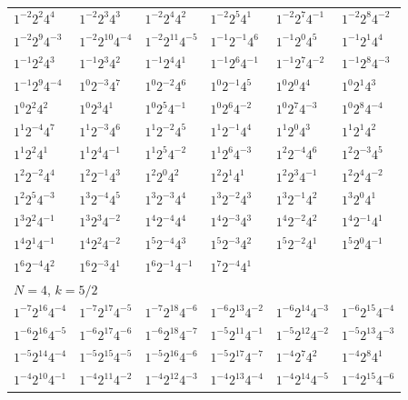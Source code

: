 \documentclass[12pt]{amsart}
\numberwithin{equation}{section}
\theoremstyle{plain}
\theoremstyle{definition}
\theoremstyle{remark}
\begin{document}
\begin{longtable}{llllll}
$1^{-2}2^{2}4^{4}$ & $1^{-2}2^{3}4^{3}$ & $1^{-2}2^{4}4^{2}$ & $1^{-2}2^{5}4^{1}$ & $1^{-2}2^{7}4^{-1}$ & $1^{-2}2^{8}4^{-2}$\\
$1^{-2}2^{9}4^{-3}$ & $1^{-2}2^{10}4^{-4}$ & $1^{-2}2^{11}4^{-5}$ & $1^{-1}2^{-1}4^{6}$ & $1^{-1}2^{0}4^{5}$ & $1^{-1}2^{1}4^{4}$\\
$1^{-1}2^{2}4^{3}$ & $1^{-1}2^{3}4^{2}$ & $1^{-1}2^{4}4^{1}$ & $1^{-1}2^{6}4^{-1}$ & $1^{-1}2^{7}4^{-2}$ & $1^{-1}2^{8}4^{-3}$\\
$1^{-1}2^{9}4^{-4}$ & $1^{0}2^{-3}4^{7}$ & $1^{0}2^{-2}4^{6}$ & $1^{0}2^{-1}4^{5}$ & $1^{0}2^{0}4^{4}$ & $1^{0}2^{1}4^{3}$\\
$1^{0}2^{2}4^{2}$ & $1^{0}2^{3}4^{1}$ & $1^{0}2^{5}4^{-1}$ & $1^{0}2^{6}4^{-2}$ & $1^{0}2^{7}4^{-3}$ & $1^{0}2^{8}4^{-4}$\\
$1^{1}2^{-4}4^{7}$ & $1^{1}2^{-3}4^{6}$ & $1^{1}2^{-2}4^{5}$ & $1^{1}2^{-1}4^{4}$ & $1^{1}2^{0}4^{3}$ & $1^{1}2^{1}4^{2}$\\
$1^{1}2^{2}4^{1}$ & $1^{1}2^{4}4^{-1}$ & $1^{1}2^{5}4^{-2}$ & $1^{1}2^{6}4^{-3}$ & $1^{2}2^{-4}4^{6}$ & $1^{2}2^{-3}4^{5}$\\
$1^{2}2^{-2}4^{4}$ & $1^{2}2^{-1}4^{3}$ & $1^{2}2^{0}4^{2}$ & $1^{2}2^{1}4^{1}$ & $1^{2}2^{3}4^{-1}$ & $1^{2}2^{4}4^{-2}$\\
$1^{2}2^{5}4^{-3}$ & $1^{3}2^{-4}4^{5}$ & $1^{3}2^{-3}4^{4}$ & $1^{3}2^{-2}4^{3}$ & $1^{3}2^{-1}4^{2}$ & $1^{3}2^{0}4^{1}$\\
$1^{3}2^{2}4^{-1}$ & $1^{3}2^{3}4^{-2}$ & $1^{4}2^{-4}4^{4}$ & $1^{4}2^{-3}4^{3}$ & $1^{4}2^{-2}4^{2}$ & $1^{4}2^{-1}4^{1}$\\
$1^{4}2^{1}4^{-1}$ & $1^{4}2^{2}4^{-2}$ & $1^{5}2^{-4}4^{3}$ & $1^{5}2^{-3}4^{2}$ & $1^{5}2^{-2}4^{1}$ & $1^{5}2^{0}4^{-1}$\\
$1^{6}2^{-4}4^{2}$ & $1^{6}2^{-3}4^{1}$ & $1^{6}2^{-1}4^{-1}$ & $1^{7}2^{-4}4^{1}$ & &\\
\midrule
\multicolumn{6}{l}{$N=4$, $k=5/2$}\\
$1^{-7}2^{16}4^{-4}$ & $1^{-7}2^{17}4^{-5}$ & $1^{-7}2^{18}4^{-6}$ & $1^{-6}2^{13}4^{-2}$ & $1^{-6}2^{14}4^{-3}$ & $1^{-6}2^{15}4^{-4}$\\
$1^{-6}2^{16}4^{-5}$ & $1^{-6}2^{17}4^{-6}$ & $1^{-6}2^{18}4^{-7}$ & $1^{-5}2^{11}4^{-1}$ & $1^{-5}2^{12}4^{-2}$ & $1^{-5}2^{13}4^{-3}$\\
$1^{-5}2^{14}4^{-4}$ & $1^{-5}2^{15}4^{-5}$ & $1^{-5}2^{16}4^{-6}$ & $1^{-5}2^{17}4^{-7}$ & $1^{-4}2^{7}4^{2}$ & $1^{-4}2^{8}4^{1}$\\
$1^{-4}2^{10}4^{-1}$ & $1^{-4}2^{11}4^{-2}$ & $1^{-4}2^{12}4^{-3}$ & $1^{-4}2^{13}4^{-4}$ & $1^{-4}2^{14}4^{-5}$ & $1^{-4}2^{15}4^{-6}$\\

\end{longtable}
\end{document}
